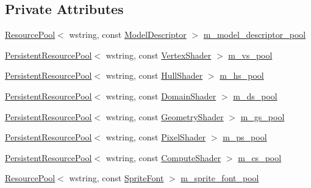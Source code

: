 \subsection*{Private Attributes}
\begin{DoxyCompactItemize}
\item 
\hyperlink{classmage_1_1_resource_pool}{Resource\+Pool}$<$ wstring, const \hyperlink{classmage_1_1_model_descriptor}{Model\+Descriptor} $>$ \hyperlink{classmage_1_1_resource_manager_af6c13ddf41f4a451a874301e8aa6042f}{m\+\_\+model\+\_\+descriptor\+\_\+pool}
\item 
\hyperlink{classmage_1_1_persistent_resource_pool}{Persistent\+Resource\+Pool}$<$ wstring, const \hyperlink{classmage_1_1_vertex_shader}{Vertex\+Shader} $>$ \hyperlink{classmage_1_1_resource_manager_abd7ceeec61ad8380f26f8f55cf530666}{m\+\_\+vs\+\_\+pool}
\item 
\hyperlink{classmage_1_1_persistent_resource_pool}{Persistent\+Resource\+Pool}$<$ wstring, const \hyperlink{namespacemage_a964e5e384b0e55ac900c819da48b6000}{Hull\+Shader} $>$ \hyperlink{classmage_1_1_resource_manager_a7eeec15dd7b10202bd9b65de965c3f49}{m\+\_\+hs\+\_\+pool}
\item 
\hyperlink{classmage_1_1_persistent_resource_pool}{Persistent\+Resource\+Pool}$<$ wstring, const \hyperlink{namespacemage_aef8cda73e2387cb89baa6c54a7fea542}{Domain\+Shader} $>$ \hyperlink{classmage_1_1_resource_manager_a4e9ddded7fb67fb172fdcd39481f0fa9}{m\+\_\+ds\+\_\+pool}
\item 
\hyperlink{classmage_1_1_persistent_resource_pool}{Persistent\+Resource\+Pool}$<$ wstring, const \hyperlink{namespacemage_a0cf0bb4b74903e78658c96412d5687a6}{Geometry\+Shader} $>$ \hyperlink{classmage_1_1_resource_manager_a4ee2d44efc1e07cb66f9aff2f36b1ef1}{m\+\_\+gs\+\_\+pool}
\item 
\hyperlink{classmage_1_1_persistent_resource_pool}{Persistent\+Resource\+Pool}$<$ wstring, const \hyperlink{namespacemage_a27ecaf266420ee7a494d64edc0757129}{Pixel\+Shader} $>$ \hyperlink{classmage_1_1_resource_manager_a0366e1441cd795c9d05b93d4e0820fca}{m\+\_\+ps\+\_\+pool}
\item 
\hyperlink{classmage_1_1_persistent_resource_pool}{Persistent\+Resource\+Pool}$<$ wstring, const \hyperlink{namespacemage_ae040329401484b076f0cd1a7c43d19c9}{Compute\+Shader} $>$ \hyperlink{classmage_1_1_resource_manager_a9814578b0ce98e74f95e825caf554c59}{m\+\_\+cs\+\_\+pool}
\item 
\hyperlink{classmage_1_1_resource_pool}{Resource\+Pool}$<$ wstring, const \hyperlink{classmage_1_1_sprite_font}{Sprite\+Font} $>$ \hyperlink{classmage_1_1_resource_manager_a258659adedbd3aa060bb8c7b77c08995}{m\+\_\+sprite\+\_\+font\+\_\+pool}

\end{DoxyCompactItemize}
